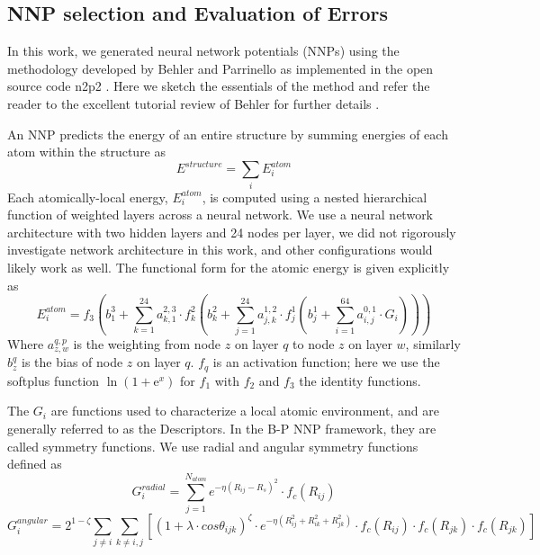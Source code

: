 \documentclass{article}
\begin{document}
\subsection{NNP selection and Evaluation of Errors} \label{sct:nnp_select_and_eval}

In this work, we generated neural network potentials (NNPs) using the methodology developed by Behler and Parrinello\cite{Behler2007} as implemented in the open source code n2p2 \cite{Singraber2019ParallelPotentials}.  Here we sketch the essentials of the method and refer the reader to the excellent tutorial review of Behler for further details \cite{Behler2015}. 

An NNP predicts the energy of an entire structure by summing energies of each atom within the structure as 
\begin{equation}
E^{structure} = \sum_i E^{atom}_i
\end{equation}
Each atomically-local energy, $E^{atom}_i$, is computed using a nested hierarchical function of weighted layers across a neural network.
We use a neural network architecture with two hidden layers and 24 nodes per layer, we did not rigorously investigate network architecture in this work, and other configurations would likely work as well.  The functional form for the atomic energy is given explicitly as
\begin{equation}
E^{atom}_i = f_3 ( b^3_1+\sum^{24}_{k=1}a^{2,3}_{k,1}\cdot f^2_k(b^2_k+\sum^{24}_{j=1}a^{1,2}_{j,k}\cdot f^1_j ( b^1_j + \sum^{64}_{i=1} a^{0,1}_{i,j}\cdot G_i  ))) 
\end{equation}
Where $a^{q,p}_{z,w}$ is the weighting from node $z$ on layer $q$ to node $z$ on layer $w$, similarly $b^q_z$ is
the bias of node $z$ on layer $q$. $f_q$ is an activation function; here we use the softplus function 
$\ln (1 + \mathrm{e}^x)$ for $f_1$ with $f_2$ and $f_3$ the identity functions.

The $G_i$ are functions used to characterize a local atomic environment, and are generally referred to as the Descriptors. In the B-P NNP framework,
they are called symmetry functions.  We use radial and angular symmetry functions defined as
\begin{equation}
G^{radial}_i = \sum^{N_{atom}}_{j=1}e^{-\eta(R_{ij}-R_{s})^2}\cdot f_c(R_{ij})
\end{equation}
\begin{equation}
G^{angular}_i = 2^{1-\zeta}\sum_{j\neq i}\sum_{k\neq i,j}[ (1+\lambda\cdot cos\theta_{ijk})^\zeta \cdot e^{-\eta(R^2_{ij}+R^2_{ik}+R^2_{jk})}\cdot f_c(R_{ij}) \cdot f_c(R_{jk}) \cdot f_c(R_{jk}) ]
\end{equation}
\end{document}
